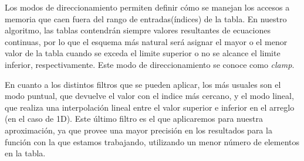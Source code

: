 Los modos de direccionamiento permiten definir cómo se manejan los accesos a memoria que caen fuera del rango de entradas(índices) de la tabla.
En nuestro algoritmo, las tablas contendrán siempre valores resultantes de ecuaciones continuas, por lo que el esquema más natural será asignar el mayor o el menor valor de la tabla cuando se exceda el limite superior o no se alcance el limite inferior, respectivamente. 
Este modo de direccionamiento se conoce como \textit{clamp}.

  
  
En cuanto a los distintos filtros que se pueden aplicar, los más usuales son el modo puntual, que devuelve el valor con el indice más cercano, y el modo lineal, 
que realiza una interpolación lineal entre el valor superior e inferior en el arreglo (en el caso de 1D). 
Este último filtro es el que aplicaremos para nuestra aproximación, ya que provee una mayor precisión en los resultados para la función con la que estamos trabajando, utilizando un menor número de elementos en la tabla.



